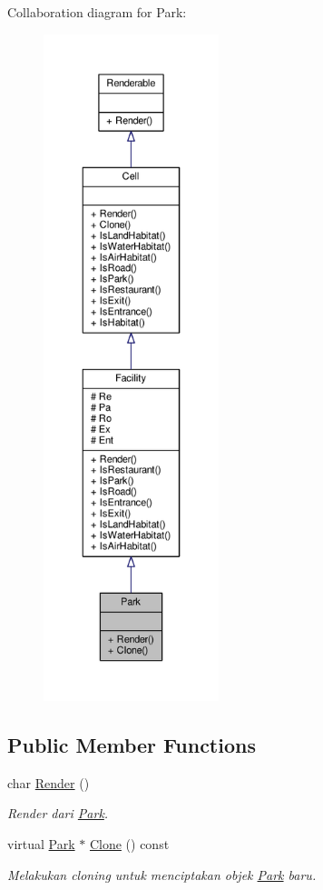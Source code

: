 Collaboration diagram for Park\+:
\nopagebreak
\begin{figure}[H]
\begin{center}
\leavevmode
\includegraphics[height=550pt]{classPark__coll__graph}
\end{center}
\end{figure}
\subsection*{Public Member Functions}
\begin{DoxyCompactItemize}
\item 
char \hyperlink{classPark_a98b2a346d5ec6703b2e988588950947e}{Render} ()
\begin{DoxyCompactList}\small\item\em Render dari \hyperlink{classPark}{Park}. \end{DoxyCompactList}\item 
virtual \hyperlink{classPark}{Park} $\ast$ \hyperlink{classPark_a573db7d7f393802c02c753572c33bef4}{Clone} () const 
\begin{DoxyCompactList}\small\item\em Melakukan cloning untuk menciptakan objek \hyperlink{classPark}{Park} baru. \end{DoxyCompactList}\end{DoxyCompactItemize}

